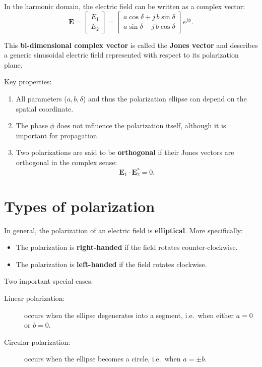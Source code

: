 In the harmonic domain, the electric field can be written as a complex vector:
\begin{equation}
    \mathbf{E}
    =
    \begin{bmatrix}
        E_1 \\ E_2
    \end{bmatrix}
    =
    \begin{bmatrix}
        a\cos\delta + j\,b\sin\delta\\[4pt]
        a\sin\delta - j\,b\cos\delta
    \end{bmatrix}
    e^{j\phi}.
\end{equation}

This \textbf{bi-dimensional complex vector} is called the \textbf{Jones vector} and describes a generic sinusoidal electric field represented with respect to its polarization plane.

\medskip
\noindent Key properties:
\begin{enumerate}
    \item All parameters ($a,b,\delta$) and thus the polarization ellipse can depend on the spatial coordinate.
    \item The phase $\phi$ does not influence the polarization itself, although it is important for propagation.
    \item Two polarizations are said to be \textbf{orthogonal} if their Jones vectors are orthogonal in the complex sense:
    \[
        \mathbf{E}_1\cdot\mathbf{E}_2^* = 0.
    \]
\end{enumerate}

\section{Types of polarization}

In general, the polarization of an electric field is \textbf{elliptical}.  
More specifically:
\begin{itemize}
    \item The polarization is \textbf{right-handed} if the field rotates counter-clockwise.
    \item The polarization is \textbf{left-handed} if the field rotates clockwise.
\end{itemize}

Two important special cases:
\begin{description}
    \item[Linear polarization:] occurs when the ellipse degenerates into a segment, i.e.\ when either $a=0$ or $b=0$.
    \item[Circular polarization:] occurs when the ellipse becomes a circle, i.e.\ when $a=\pm b$.
\end{description}

